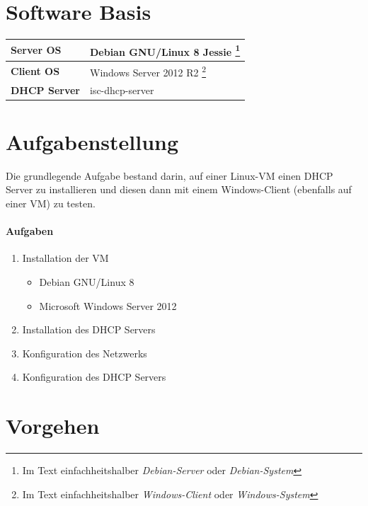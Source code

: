 \documentclass[12pt,a4paper,twoside,titlepage]{article}
\title{\titleText}
\author{\authorText}
\date{\dateText}
\begin{document}
	\maketitle
	\tableofcontents

        \section{Software Basis}

        \begin{tabular}{|l|l|}
          \hline
          \textbf{Server OS} & Debian GNU/Linux 8 Jessie \footnote{Im Text einfachheitshalber \textit{Debian-Server} oder \textit{Debian-System}}\\\hline
          \textbf{Client OS} & Windows Server 2012 R2 \footnote{Im Text einfachheitshalber \textit{Windows-Client} oder \textit{Windows-System}} \\\hline
          \textbf{DHCP Server} & isc-dhcp-server \\\hline
        \end{tabular}

        \section{Aufgabenstellung}

        Die grundlegende Aufgabe bestand darin, auf einer Linux-VM einen DHCP Server zu installieren und diesen dann mit einem Windows-Client (ebenfalls auf einer VM) zu testen.

        \paragraph{Aufgaben}
        \begin{enumerate}
        \item Installation der VM
          \begin{itemize}
          \item Debian GNU/Linux 8
          \item Microsoft Windows Server 2012
          \end{itemize}
        \item Installation des DHCP Servers
        \item Konfiguration des Netzwerks
        \item Konfiguration des DHCP Servers
        \end{enumerate}

        \section{Vorgehen}
\end{document}
